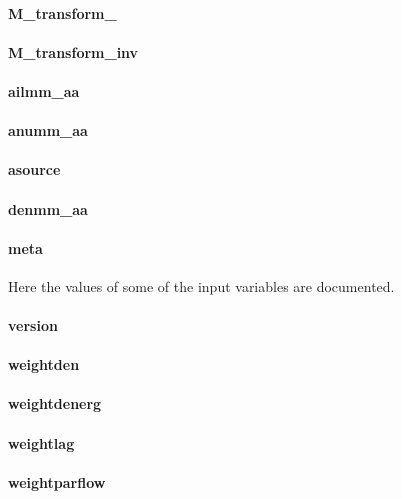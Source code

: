 \paragraph{M\_transform\_}

\paragraph{M\_transform\_inv}

\paragraph{ailmm\_aa}

\paragraph{anumm\_aa}

\paragraph{asource}

\paragraph{denmm\_aa}

\paragraph{meta}
Here the values of some of the input variables are documented.

\paragraph{version}

\paragraph{weightden}

\paragraph{weightdenerg}

\paragraph{weightlag}

\paragraph{weightparflow}

